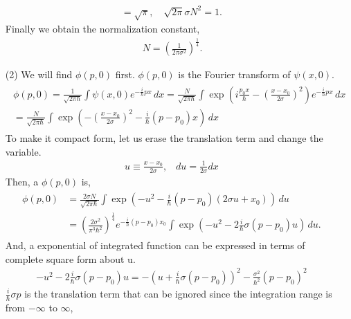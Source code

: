 \documentclass[floatfix,nofootinbib,superscriptaddress,fleqn]{revtex4}
\begin{document}
\begin{itemize}
\begin{align*}
    = \sqrt{\pi},\quad \sqrt{2\pi}\sigma N^2 =1.
  \end{align*}
Finally we obtain the normalization constant,
  \begin{align}
    \,N = {\left(\frac{1}{2\pi\sigma^2}\right)}^{\frac{1}{4}}.
  \end{align}
  \item[(2)]  We will find $\phi(p,0)$ first. 
  $\phi(p,0)$ is the Fourier transform of $\psi(x,0)$.
  \begin{align*}
    \begin{split} 
      \phi(p,0)=\frac{1}{\sqrt{2\pi\hbar}}
      \int\psi(x,0) e^{-\frac{i}{\hbar}px}\,dx
      =\frac{N}{\sqrt{2\pi\hbar}}
      \int\exp\left(i\frac{p_0 x}{\hbar}-{\left(
        \frac{x-x_0}{2\sigma}\right)}^2\right) 
        e^{-\frac{i}{\hbar}px}\,dx  \\
        =\frac{N}{\sqrt{2\pi\hbar}}
        \int\exp\left(-{\left(\frac{x-x_0}{2\sigma}\right)}^2
        -\frac{i}{\hbar}(p-p_0)x\right)\,dx
      \end{split}
  \end{align*}
  To make it compact form, let us erase the translation term 
  and change the variable.
  \begin{align*}
    u \equiv \frac{x-x_0}{2\sigma},\;\;\; du = \frac{1}{2\sigma} dx 
  \end{align*}
  Then, a $\phi(p,0)$ is,
  \begin{align*}
    \begin{split}
      \phi(p,0)&=\frac{2\sigma N}{\sqrt{2\pi\hbar}}
      \int\exp\left(-{u}^2-\frac{i}{\hbar}(p-p_0)(2\sigma u+x_0)\right)\,du \\
      &={\left(\frac{2\sigma^2}{\pi^3\hbar^2}\right)}^{\frac{1}{4}}
      e^{-\frac{i}{\hbar}(p-p_0)x_0}
      \int\exp\left(-u^2-2\frac{i}{\hbar}\sigma (p-p_0)u\right)\,du.
    \end{split}
  \end{align*}
  And, a exponential of integrated function can be expressed 
  in terms of complete square form about u.
  \begin{align}
    -u^2-2\frac{i}{\hbar}\sigma (p-p_0)u 
    = -{\left( u+\frac{i}{\hbar}\sigma (p-p_0)\right)}^2
    -\frac{\sigma^2}{\hbar^2}{(p-p_0)}^2
  \end{align}
  $\frac{i}{\hbar}\sigma p$ is the translation term that can be ignored 
  since the integration range is from $-\infty$ to $\infty$,
  \begin{align*}
    \begin{split}  

\end{split}
\end{align*}
\end{itemize}
\end{document}

